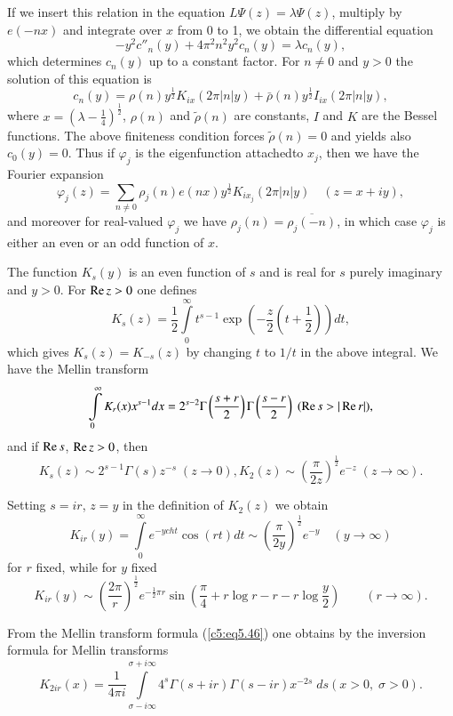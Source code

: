 If we insert this relation in the equation $L\Psi (z) = \lambda
\Psi(z)$, multiply by $e(-nx)$ and integrate over $x$ from 0 to 1, we
obtain the  differential equation 
$$
-y^2 c''_n(y) + 4 \pi^2 n^2 y^2 c_n(y) = \lambda c_n(y), 
$$
which determines $c_n(y)$ up to a constant factor. For $n \neq 0$ and
$y>0$ the solution of this equation is  
$$
c_n(y) = \rho (n) y^{\frac{1}{2}} K_{ix}  (2\pi |n| y) + \bar{\rho}
(n) y^{\frac{1}{2}} I_{ix} (2\pi |n| y), 
$$
where $x = \left(\lambda - \frac{1}{4} \right)^{\frac{1}{2}}$,
$\rho(n)$ and $\tilde{\rho}(n)$ are constants, $I$ and $K$ are the
Bessel functions. The above finiteness condition forces
$\tilde{\rho}(n) = 0$ and yields also $c_0(y) =0$. Thus if $\varphi_j$
is the eigenfunction attached\pageoriginale to $x_j$, then we have the
Fourier expansion 
$$
\varphi_j (z) = \sum\limits_{n \neq 0} \rho_j(n)  e (nx)
y^{\frac{1}{2}} K_{ix_j} (2\pi |n| y) \quad (z = x + iy), 
$$
and moreover for real-valued $\varphi_j$ we have $\rho_j(n) =
\overline{\rho_j (-n)}$, in which case $\varphi_j$ is either an even
or an odd function of $x$. 

The function $K_s(y)$ is an even function of $s$ and is real for $s$
purely imaginary and $y>0$. For $\operatorname{Re} z >0$ one defines 
$$
K_s (z) = \frac{1}{2} \int\limits^\infty_{0} t^{s-1} \exp
\left(-\frac{z}{2} \left(t+ \frac{1}{2} \right) \right) dt,
$$ 
which gives $K_s(z) = K_{-s} (z)$ by changing $t$ to $1/t$ in the
above integral. We have the Mellin transform 
\begin{equation}
\int\limits^\infty_{0} K_r(x) x^{s-1} dx = 2^{s-2} \Gamma
\left(\frac{s+r}{2} \right) \Gamma  \left(\frac{s-r}{2} \right) \;
(\operatorname{Re} s > |\operatorname{Re} r|),\label{c5:eq5.46} 
\end{equation}
and if $\operatorname{Re} s$, $\operatorname{Re} z > 0$, then 
$$
K_s (z) \sim 2^{s-1}  \Gamma (s) z^{-s} \; (z \to 0) , K_2(z) \sim \left(\frac{\pi}{2z}\right)^{\frac{1}{2}} e^{-z} \; (z \to \infty). 
$$

Setting $s = ir$, $z = y$ in the definition of $K_2(z)$ we obtain
$$
K_{ir} (y) = \int\limits^\infty_0 e^{-y ch t} \cos (rt) dt \sim
\left(\frac{\pi}{2y} \right)^{\frac{1}{2}} e^{-y } \quad (y \to
\infty) 
$$
for $r$ fixed, while for $y$ fixed
$$
K_{ir} (y) \sim \left(\frac{2\pi}{r} \right)^{\frac{1}{2}}
e^{-\frac{1}{2}\pi r} \sin \left(\frac{\pi}{4} + r \log r - r - r \log
\frac{y}{2} \right) \qquad (r \to \infty). 
$$ 

From the Mellin transform formula (\ref{c5:eq5.46}) one obtains by the
inversion formula for Mellin transforms 
$$
K_{2ir} (x) = \frac{1}{4\pi i} \int\limits^{\sigma + i \infty}_{\sigma
  -i \infty} 4^s \Gamma(s+ir) \Gamma (s - ir ) x^{-2s } \; ds (x > 0,
\; \sigma > 0). 
$$ 

